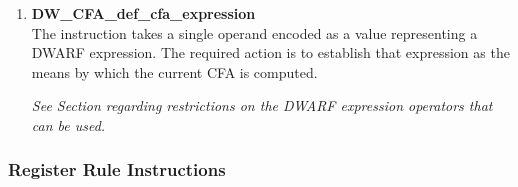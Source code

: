 \begin{enumerate}[1. ]
\item \textbf{DW\_CFA\_def\_cfa\_expression} \\
The  
instruction takes a 
single operand encoded as a 
 value representing a
DWARF expression. The required action is to establish that
expression as the means by which the current CFA is computed.

\textit{See Section  
regarding restrictions on the DWARF
expression operators that can be used.}

\end{enumerate}

\subsubsection{Register Rule Instructions}
\label{chap:registerruleinstructions}
